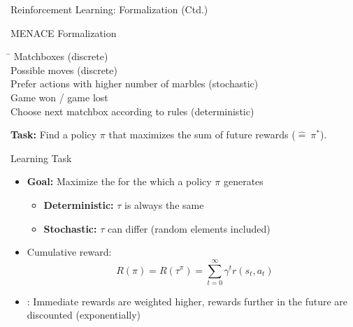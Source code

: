\begin{frame}{Reinforcement Learning: Formalization (Ctd.)}{}
	
\end{frame}


\begin{frame}{MENACE Formalization}{}
	\begin{tabbing}
		\hspace*{4cm}\= \kill
		 				\> Matchboxes (discrete) \\[1mm]
		 				\> Possible moves (discrete) \\[1mm]
						\> Prefer actions with higher number of marbles (stochastic) \\[1mm]
		 				\> Game won / game lost \\[1mm]
				\> Choose next matchbox according to rules (deterministic)
	\end{tabbing}
		
	\begin{boxBlueNoFrame}
		\textbf{Task:} Find a policy $\pi$ that maximizes the sum of future rewards ($\widehat{=}\ \pi^*$).
	\end{boxBlueNoFrame}
\end{frame}


\begin{frame}{Learning Task}{}
	\begin{itemize}
		\item \textbf{Goal:} Maximize the  for the 
			which a policy $\pi$ generates
		\begin{itemize}
			\item \textbf{Deterministic:} $\tau$ is always the same
			\item \textbf{Stochastic:} $\tau$ can differ (random elements included)
		\end{itemize}
		\item Cumulative reward:
		\begin{equation}
			R(\pi) = R(\tau^{\pi}) = \sum_{t=0}^{\infty} \gamma^t r(s_t, a_t)
		\end{equation}
		\item {}: Immediate rewards are weighted higher,
			rewards further in the future are discounted (exponentially)
	\end{itemize}
\end{frame}


